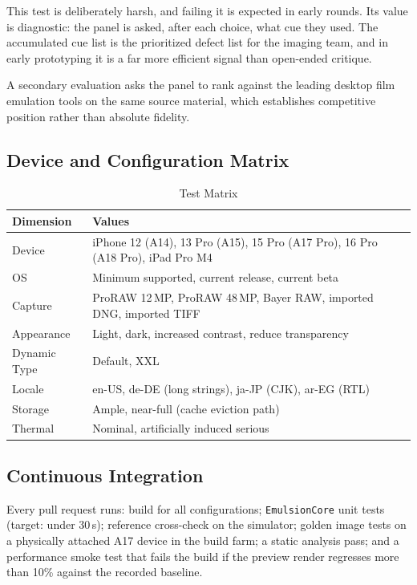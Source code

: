 This test is deliberately harsh, and failing it is expected in early rounds. Its
value is diagnostic: the panel is asked, after each choice, what cue they used.
The accumulated cue list is the prioritized defect list for the imaging team,
and in early prototyping it is a far more efficient signal than open-ended
critique.

A secondary evaluation asks the panel to rank \EM{} against the leading desktop
film emulation tools on the same source material, which establishes competitive
position rather than absolute fidelity.

\subsection{Device and Configuration Matrix}

\begin{table}[htbp]
\caption{Test Matrix}
\label{tab:testmatrix}
\begin{center}
\renewcommand{\arraystretch}{1.15}
\begin{tabularx}{\columnwidth}{@{}l>{\raggedright\arraybackslash}X@{}}
\toprule
\textbf{Dimension} & \textbf{Values} \\
\midrule
Device & iPhone 12 (A14), 13 Pro (A15), 15 Pro (A17 Pro), 16 Pro (A18 Pro), iPad Pro M4 \\
OS & Minimum supported, current release, current beta \\
Capture & ProRAW 12\,MP, ProRAW 48\,MP, Bayer RAW, imported DNG, imported TIFF \\
Appearance & Light, dark, increased contrast, reduce transparency \\
Dynamic Type & Default, XXL \\
Locale & en-US, de-DE (long strings), ja-JP (CJK), ar-EG (RTL) \\
Storage & Ample, near-full (cache eviction path) \\
Thermal & Nominal, artificially induced serious \\
\bottomrule
\end{tabularx}
\end{center}
\end{table}

\subsection{Continuous Integration}

Every pull request runs: build for all configurations; \texttt{EmulsionCore}
unit tests (target: under 30\,s); reference cross-check on the simulator;
golden image tests on a physically attached A17 device in the build farm; a
static analysis pass; and a performance smoke test that fails the build if the
preview render regresses more than 10\% against the recorded baseline.


